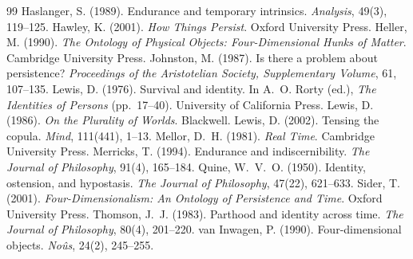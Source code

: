 \documentclass{situationist-preprint}
\begin{document}
\begin{thebibliography}{99}\small
{} Haslanger, S. (1989). Endurance and temporary intrinsics. \emph{Analysis}, 49(3), 119--125.
 Hawley, K. (2001). \emph{How Things Persist}. Oxford University Press.
 Heller, M. (1990). \emph{The Ontology of Physical Objects: Four-Dimensional Hunks of Matter}. Cambridge University Press.
 Johnston, M. (1987). Is there a problem about persistence? \emph{Proceedings of the Aristotelian Society, Supplementary Volume}, 61, 107--135.
 Lewis, D. (1976). Survival and identity. In A.~O. Rorty (ed.), \emph{The Identities of Persons} (pp.~17--40). University of California Press.
 Lewis, D. (1986). \emph{On the Plurality of Worlds}. Blackwell.
 Lewis, D. (2002). Tensing the copula. \emph{Mind}, 111(441), 1--13.
 Mellor, D.~H. (1981). \emph{Real Time}. Cambridge University Press.
 Merricks, T. (1994). Endurance and indiscernibility. \emph{The Journal of Philosophy}, 91(4), 165--184.
 Quine, W.~V.~O. (1950). Identity, ostension, and hypostasis. \emph{The Journal of Philosophy}, 47(22), 621--633.
 Sider, T. (2001). \emph{Four-Dimensionalism: An Ontology of Persistence and Time}. Oxford University Press.
 Thomson, J.~J. (1983). Parthood and identity across time. \emph{The Journal of Philosophy}, 80(4), 201--220.
 van Inwagen, P. (1990). Four-dimensional objects. \emph{No\^us}, 24(2), 245--255.
\end{thebibliography}
\end{document}
